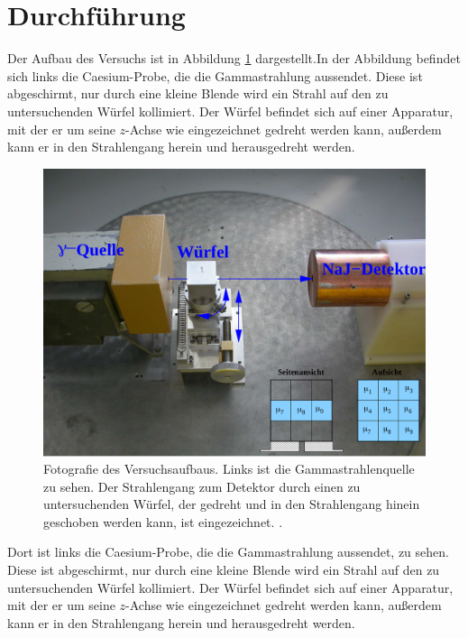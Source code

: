 \section{Durchführung}
\label{sec:Durchführung}

Der Aufbau des Versuchs ist in Abbildung \ref{fig:aufbau} dargestellt.In der Abbildung befindet sich links die Caesium-Probe, die die Gammastrahlung aussendet. Diese ist abgeschirmt, nur durch eine kleine Blende wird ein Strahl auf den zu untersuchenden Würfel kollimiert. Der Würfel befindet sich auf einer Apparatur, mit der er um seine $z$-Achse wie eingezeichnet gedreht werden kann, außerdem kann er in den Strahlengang herein und herausgedreht werden.

\begin{figure}
  \centering
  \includegraphics[width=\textwidth]{images/aufbau.png}
  \caption{Fotografie des Versuchsaufbaus. Links ist die Gammastrahlenquelle zu sehen. Der Strahlengang zum Detektor durch einen zu untersuchenden Würfel, der gedreht und in den Strahlengang hinein geschoben werden kann, ist eingezeichnet. \cite{Versuchsanleitung}.}
  \label{fig:aufbau}
\end{figure}

Dort ist links die Caesium-Probe, die die Gammastrahlung aussendet, zu sehen. Diese ist abgeschirmt, nur durch eine kleine Blende wird ein Strahl auf den zu untersuchenden Würfel kollimiert. Der Würfel befindet sich auf einer Apparatur, mit der er um seine $z$-Achse wie eingezeichnet gedreht werden kann, außerdem kann er in den Strahlengang herein und herausgedreht werden.

